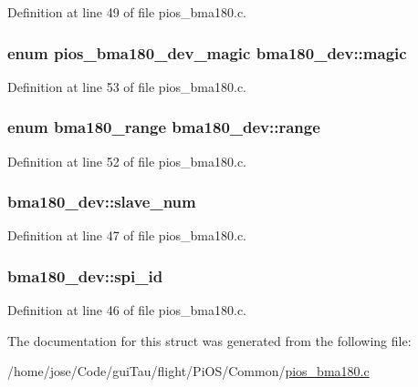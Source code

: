 Definition at line 49 of file pios\-\_\-bma180.\-c.

\hypertarget{structbma180__dev_ad45772028b3de22401b0bcf218c289e9}{
\subsubsection[{magic}]{\setlength{\rightskip}{0pt plus 5cm}enum {\bf pios\-\_\-bma180\-\_\-dev\-\_\-magic} bma180\-\_\-dev\-::magic}}\label{structbma180__dev_ad45772028b3de22401b0bcf218c289e9}


Definition at line 53 of file pios\-\_\-bma180.\-c.

\hypertarget{structbma180__dev_a85103d7472326b03f89d2b658d56aecc}{
\subsubsection[{range}]{\setlength{\rightskip}{0pt plus 5cm}enum {\bf bma180\-\_\-range} bma180\-\_\-dev\-::range}}\label{structbma180__dev_a85103d7472326b03f89d2b658d56aecc}


Definition at line 52 of file pios\-\_\-bma180.\-c.

\hypertarget{structbma180__dev_a9743ebc53aa6398ca08d7b796228b47c}{
\subsubsection[{slave\-\_\-num}]{ bma180\-\_\-dev\-::slave\-\_\-num}}\label{structbma180__dev_a9743ebc53aa6398ca08d7b796228b47c}


Definition at line 47 of file pios\-\_\-bma180.\-c.

\hypertarget{structbma180__dev_aa0e8c93b86245e1fd072692c70d8df2d}{
\subsubsection[{spi\-\_\-id}]{ bma180\-\_\-dev\-::spi\-\_\-id}}\label{structbma180__dev_aa0e8c93b86245e1fd072692c70d8df2d}


Definition at line 46 of file pios\-\_\-bma180.\-c.



The documentation for this struct was generated from the following file\-:\begin{DoxyCompactItemize}
\item 
/home/jose/\-Code/gui\-Tau/flight/\-Pi\-O\-S/\-Common/\hyperlink{pios__bma180_8c}{pios\-\_\-bma180.\-c}\end{DoxyCompactItemize}
